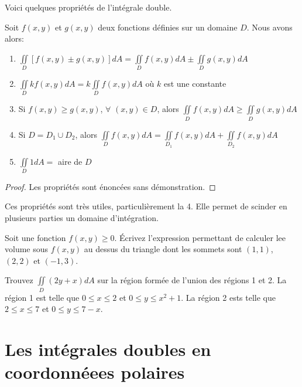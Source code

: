 \documentclass[]{book}
\theoremstyle{definition}
\theoremstyle{definition}
\theoremstyle{definition}
\theoremstyle{remark}
\let\BeginKnitrBlock\begin \let\EndKnitrBlock\end
\begin{document}
Voici quelques propriétés de l'intégrale double.
\BeginKnitrBlock{theorem}
\protect\hypertarget{thm:unnamed-chunk-254}{}{\label{thm:unnamed-chunk-254}
}Soit \(f(x,y)\) et \(g(x,y)\) deux fonctions définies sur un domaine
\(D\). Nous avons alors:

\begin{enumerate}
\def\labelenumi{\arabic{enumi}.}
\item
  \(\iint\limits_D \left[f(x,y)\pm g(x,y)\right]dA=\iint\limits_D f(x,y)dA \pm \iint\limits_D g(x,y)dA\)
\item
  \(\iint\limits_D kf(x,y)dA=k\iint\limits_D f(x,y)dA\) où \(k\) est une
  constante
\item
  Si \(f(x,y)\geq g(x,y)\), \(\forall\) \((x,y)\in D\), alors
  \(\iint\limits_D f(x,y)dA\geq \iint\limits_D g(x,y)dA\)
\item
  Si \(D=D_1 \cup D_2\), alors
  \(\iint\limits_D f(x,y)dA=\iint\limits_{D_1} f(x,y)dA+\iint\limits_{D_2} f(x,y)dA\)
\item
  \(\iint\limits_D 1dA=\) aire de \(D\)
\end{enumerate}
\EndKnitrBlock{theorem}

\BeginKnitrBlock{proof}
{}Les propriétés sont énoncées sans
démonstration.
\EndKnitrBlock{proof}

Ces propriétés sont très utiles, particulièrement la 4. Elle permet de
scinder en plusieurs parties un domaine d'intégration.

\BeginKnitrBlock{example}
\protect\hypertarget{exm:unnamed-chunk-256}{}{\label{exm:unnamed-chunk-256}
}Soit une fonction \(f(x,y)\geq 0\). Écrivez l'expression permettant de
calculer lee volume sous \(f(x,y)\) au dessus du triangle dont les
sommets sont \((1,1)\), \((2,2)\) et \((-1,3)\).
\EndKnitrBlock{example}
\vspace*{8cm}

\BeginKnitrBlock{example}
\protect\hypertarget{exm:unnamed-chunk-257}{}{\label{exm:unnamed-chunk-257}
}Trouvez \(\iint\limits_D (2y+x)dA\) sur la région formée de l'union des
régions 1 et 2. La région 1 est telle que \(0\leq x \leq 2\) et
\(0\leq y \leq x^2+1\). La région 2 ests telle que \(2\leq x\leq 7\) et
\(0\leq y \leq 7-x\).
\EndKnitrBlock{example}
\vspace*{8cm}

\hypertarget{int-coord-polaires}{%
\section{Les intégrales doubles en coordonnéees
polaires}\label{int-coord-polaires}}
\end{document}
